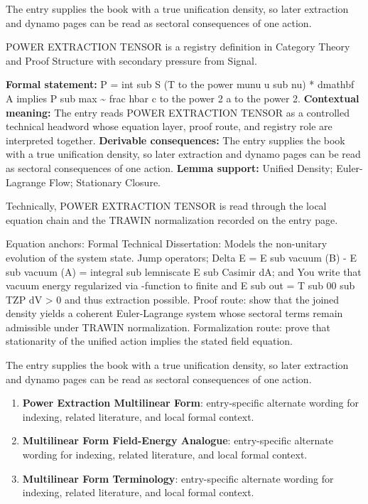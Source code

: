 The entry supplies the book with a true unification density, so later extraction and dynamo pages can be read as sectoral consequences of one action.
\clearpage


\begingroup\small
{}
POWER EXTRACTION TENSOR is a registry definition in Category Theory and Proof Structure with secondary pressure from Signal.

\begingroup\footnotesize\setlength{\emergencystretch}{3em}\sloppy
\textbf{Formal statement:} P = int sub S (T to the power munu u sub nu) * dmathbf A implies P sub max \textasciitilde{} frac hbar c to the power 2 a to the power 2. \textbf{Contextual meaning:} The entry reads POWER EXTRACTION TENSOR as a controlled technical headword whose equation layer, proof route, and registry role are interpreted together. \textbf{Derivable consequences:} The entry supplies the book with a true unification density, so later extraction and dynamo pages can be read as sectoral consequences of one action. \textbf{Lemma support:} Unified Density; Euler-Lagrange Flow; Stationary Closure.\par
\endgroup

Technically, POWER EXTRACTION TENSOR is read through the local equation chain and the TRAWIN normalization recorded on the entry page.

Equation anchors: Formal Technical Dissertation: Models the non-unitary evolution of the system state. Jump operators; Delta E = E sub vacuum (B) - E sub vacuum (A) = integral sub lemniscate E sub Casimir dA; and You write that vacuum energy regularized via  -function to finite and E sub out =   T sub 00   sub TZP dV > 0 and thus extraction possible. Proof route: show that the joined density yields a coherent Euler-Lagrange system whose sectoral terms remain admissible under TRAWIN normalization. Formalization route: prove that stationarity of the unified action implies the stated field equation.

The entry supplies the book with a true unification density, so later extraction and dynamo pages can be read as sectoral consequences of one action.
\endgroup

\begin{enumerate}[leftmargin=1.6em,itemsep=6pt,topsep=4pt]
\item \textbf{Power Extraction Multilinear Form}: entry-specific alternate wording for indexing, related literature, and local formal context.
\item \textbf{Multilinear Form Field-Energy Analogue}: entry-specific alternate wording for indexing, related literature, and local formal context.
\item \textbf{Multilinear Form Terminology}: entry-specific alternate wording for indexing, related literature, and local formal context.
\end{enumerate}

